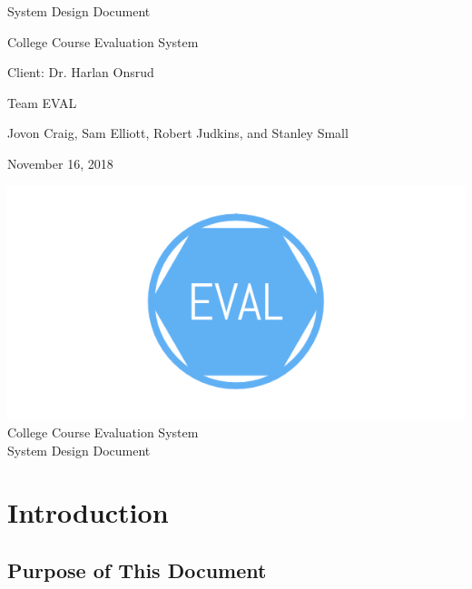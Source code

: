 \documentclass{article}
\begin{document}
\begin{titlepage}

\centering
\vspace*{2cm}
{\Huge System Design Document\par}
\vspace{1cm}
{\LARGE College Course Evaluation System\par}
\vspace{1cm}
{\Large Client: Dr. Harlan Onsrud\par}
\vspace{1cm}
{\Large Team EVAL\par}
\vspace{.2cm}
{\Large Jovon Craig, Sam Elliott, Robert Judkins, and Stanley Small\par}
\vspace{1cm}
{\Large November 16, 2018\par}
\vspace{.5cm}

\end{titlepage}

\newpage

\begin{center}
{\includegraphics[scale=.3]{images/team_logo.png}} \\ 	\bigskip
{\LARGE College Course Evaluation System } \\ \medskip
{\large System Design Document } \\ \medskip
\end{center}

\tableofcontents

\newpage

\section{Introduction}
\subsection{Purpose of This Document}
\end{document}
